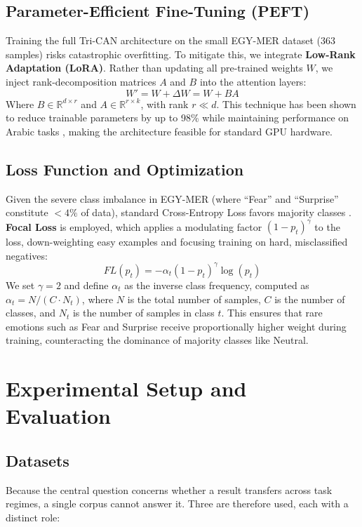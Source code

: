 \documentclass[12pt, a4paper]{article}
\begin{document}
\subsection{Parameter-Efficient Fine-Tuning (PEFT)}
Training the full Tri-CAN architecture on the small EGY-MER dataset (363 samples) risks catastrophic overfitting. To mitigate this, we integrate \textbf{Low-Rank Adaptation (LoRA)}. Rather than updating all pre-trained weights $W$, we inject rank-decomposition matrices $A$ and $B$ into the attention layers:
\begin{equation}
    W' = W + \Delta W = W + BA
\end{equation}
Where $B \in \mathbb{R}^{d \times r}$ and $A \in \mathbb{R}^{r \times k}$, with rank $r \ll d$. This technique has been shown to reduce trainable parameters by up to 98\% while maintaining performance on Arabic tasks \citep{KhaledUniText2025}, making the architecture feasible for standard GPU hardware.

\subsection{Loss Function and Optimization}
Given the severe class imbalance in EGY-MER (where ``Fear'' and ``Surprise'' constitute $<4\%$ of data), standard Cross-Entropy Loss favors majority classes \citep{Hussein2025}. \textbf{Focal Loss} is employed, which applies a modulating factor $(1 - p_t)^\gamma$ to the loss, down-weighting easy examples and focusing training on hard, misclassified negatives:
\begin{equation}
    FL(p_t) = -\alpha_t (1 - p_t)^\gamma \log(p_t)
\end{equation}
We set $\gamma = 2$ and define $\alpha_t$ as the inverse class frequency, computed as $\alpha_t = N / (C \cdot N_t)$, where $N$ is the total number of samples, $C$ is the number of classes, and $N_t$ is the number of samples in class $t$. This ensures that rare emotions such as Fear and Surprise receive proportionally higher weight during training, counteracting the dominance of majority classes like Neutral.


\section{Experimental Setup and Evaluation}\label{sec:experiments}

\subsection{Datasets}
Because the central question concerns whether a result transfers across task regimes, a single corpus cannot answer it. Three are therefore used, each with a distinct role:
\end{document}
